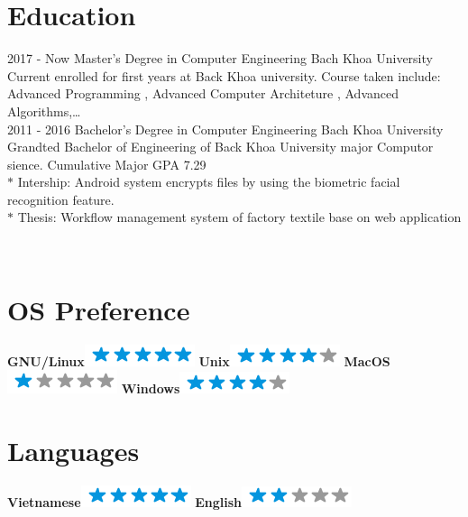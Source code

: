 \documentclass[]{friggeri-cv}
\begin{document}
\section{Education}
\begin{entrylist}
  \entry
    {2017 - Now}
    {Master's Degree in Computer Engineering}
    {Bach Khoa University}
    {Current enrolled for first years at Back Khoa university. Course taken include: 
Advanced Programming , Advanced Computer Architeture , Advanced Algorithms,…\\}
  \entry
    {2011 - 2016}
    {Bachelor's Degree in Computer Engineering}
    {Bach Khoa University}
    {Grandted Bachelor of Engineering of Back Khoa University major Computor sience. Cumulative Major GPA 7.29\\
       $*$ Intership: Android system encrypts files by using the biometric facial recognition feature.\\
       $*$ Thesis: 	Workflow management system of factory textile base on web application\\}
\end{entrylist}

\newpage

\begin{aside}
~
~
~
  \section{OS Preference}
    \textbf{GNU/Linux}\includegraphics[scale=0.40]{img/5stars.png}
    \textbf{Unix}\includegraphics[scale=0.40]{img/4stars.png}
    \textbf{MacOS}\includegraphics[scale=0.40]{img/1stars.png}
    \textbf{Windows}\includegraphics[scale=0.40]{img/4stars.png}
  \section{Languages}
    \textbf{Vietnamese}\includegraphics[scale=0.40]{img/5stars.png}
    \textbf{English}\includegraphics[scale=0.40]{img/2stars.png}
    ~
\end{aside}
\end{document}
